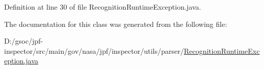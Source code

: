 Definition at line 30 of file Recognition\+Runtime\+Exception.\+java.



The documentation for this class was generated from the following file\+:\begin{DoxyCompactItemize}
\item 
D\+:/gsoc/jpf-\/inspector/src/main/gov/nasa/jpf/inspector/utils/parser/\hyperlink{_recognition_runtime_exception_8java}{Recognition\+Runtime\+Exception.\+java}\end{DoxyCompactItemize}
